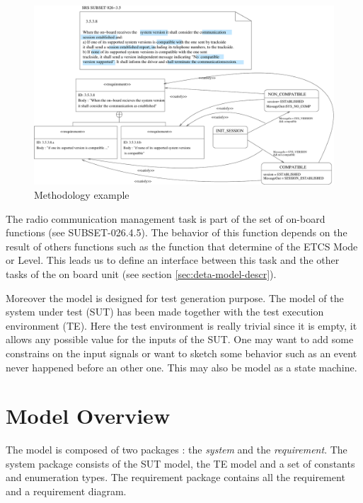 \documentclass{template/openetcs_article}
\begin{document}
\begin{figure}[htbp]
\centering
\includegraphics[width=\textwidth]{methodo_example}
\caption{\label{fig:methodo-ex} Methodology example}
\end{figure}

The radio communication management task is part of the set of on-board functions
(see SUBSET-026.4.5). The behavior of this function depends on the result of
others functions such as the function that determine of the ETCS Mode or Level.
This leads us to define an interface between this task
and the other tasks of the on board unit (see section \ref{sec:deta-model-descr}).

Moreover the model is designed for test generation purpose. The model of the
system under test (SUT)  has been
made together with the test execution environment (TE). Here the test
environment is really trivial since it is empty, it allows any possible value
for the inputs of the SUT. One may want to add some constrains on the input
signals or want to sketch some behavior such as an event never happened before
an other one. This may also be model as a state machine.

\section{Model Overview}
\label{sec:model-overview}
The model is composed of two packages : the \emph{system} and the
\emph{requirement}. The system package consists of the SUT model, the TE
model and a set of constants and enumeration types. The
requirement package contains all the requirement and a requirement diagram.

\end{document}
